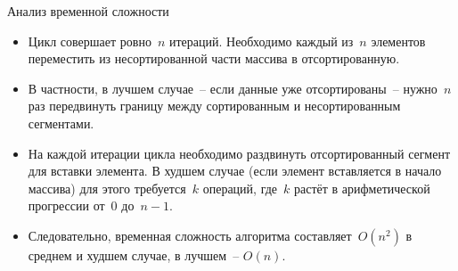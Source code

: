 \documentclass[landscape]{slides}
\begin{document}
\begin{slide}
  Анализ временной сложности
  \begin{itemize}
      \item Цикл совершает ровно~$n$ итераций. Необходимо каждый из~$n$ элементов переместить из несортированной части
        массива в отсортированную.
      \item В частности, в лучшем случае~-- если данные уже отсортированы~-- нужно~$n$ раз передвинуть границу между
        сортированным и несортированным сегментами.
      \item На каждой итерации цикла необходимо раздвинуть отсортированный сегмент для вставки элемента. В худшем случае
        (если элемент вставляется в начало массива) для этого требуется~$k$ операций, где~$k$ растёт в арифметической
        прогрессии от~$0$ до~$n-1$.
      \item Следовательно, временная сложность алгоритма составляет~$O(n^2)$ в среднем и худшем случае, в лучшем~-- $O(n)$.
  \end{itemize}
\end{slide}
\end{document}
